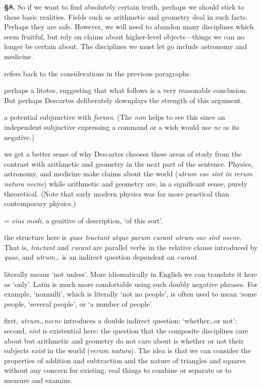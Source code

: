 \prenotes

\textbf{§8.} So if we want to find absolutely certain truth, perhaps we should stick to these basic realities. Fields such as arithmetic and geometry deal in such facts. Perhaps they are safe. However, we will need to abandon many disciplines which seem fruitful, but rely on claims about higher-level objects---things we can no longer be certain about. The disciplines we must let go include astronomy and medicine.

 refers back to the considerations in the previous paragraphs.

 perhaps a litotes, suggesting that what follows is a very reasonable conclusion. But perhaps Descartes deliberately downplays the strength of this argument.

 a potential subjunctive with \textit{forsan}. (The \textit{non} helps to see this since an independent subjuctive expressing a command or a wish would use \textit{ne} as its negative.)

 we get a better sense of why Descartes chooses these areas of study from the contrast with arithmetic and geometry in the next part of the sentence. Physics, astronomy, and medicine make claims about the world (\textit{utrum eae sint in rerum natura necne}) while arithmetic and geometry are, in a significant sense, purely theoretical. (Note that early modern physics was far more practical than contemporary physics.)

 = \textit{eius modi}, a genitive of description, `of this sort'.

 the structure here is \textit{quae tractant atque parum curant utrum eae sint necne}. That is, \textit{tractant} and \textit{curant} are parallel verbs in the relative clause introduced by \textit{quae}, and \textit{utrum\dots} is an indirect question dependent on \textit{curant}.

 literally means `not unless'. More idiomatically in English we can translate it here as `only'. Latin is much more comfortable using such doubly negative phrases. For example, `nonnulli', which is literally `not no people', is often used to mean `some people, `several people', or `a number of people'.

 first, \textit{utrum\dots necne} introduces a double indirect question: `whether\dots or not'; second, \textit{sint} is existential here: the question that the composite disciplines care about but arithmetic and geometry do not care about is whether or not their subjects \textit{exist} in the world (\textit{rerum natura}). The idea is that we can consider the properties of addition and subtraction and the nature of triangles and squares without any concern for existing, real things to combine or separate or to measure and examine.

